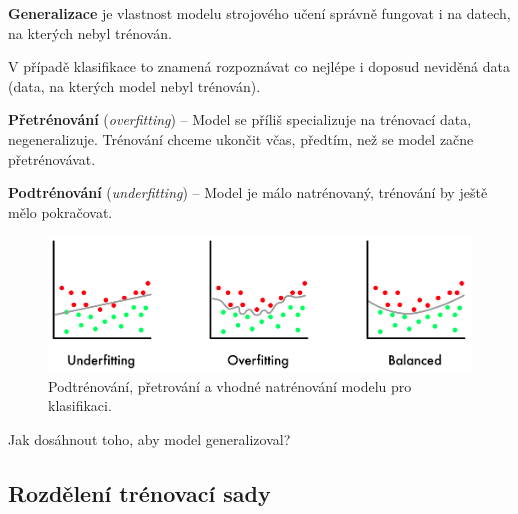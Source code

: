 \begin{compactitem}
    \item \textbf{Generalizace} je vlastnost modelu strojového učení správně fungovat i na datech, na kterých nebyl trénován.

    \begin{compactitem}
        \item V případě klasifikace to znamená rozpoznávat co nejlépe i doposud neviděná data (data, na kterých model nebyl trénován).
    \end{compactitem}

    \item \textbf{Přetrénování} (\textit{overfitting}) -- Model se příliš specializuje na trénovací data, negeneralizuje. Trénování chceme ukončit včas, předtím, než se model začne přetrénovávat.

    \item \textbf{Podtrénování} (\textit{underfitting}) -- Model je málo natrénovaný, trénování by ještě mělo pokračovat.

    \begin{figure}[H]
        \centering
        \includegraphics[width=1\linewidth]{fitting.png}
        \caption{Podtrénování, přetrování a vhodné natrénování modelu pro klasifikaci.}
    \end{figure}

    \item Jak dosáhnout toho, aby model generalizoval?
\end{compactitem}

\subsection{Rozdělení trénovací sady}

